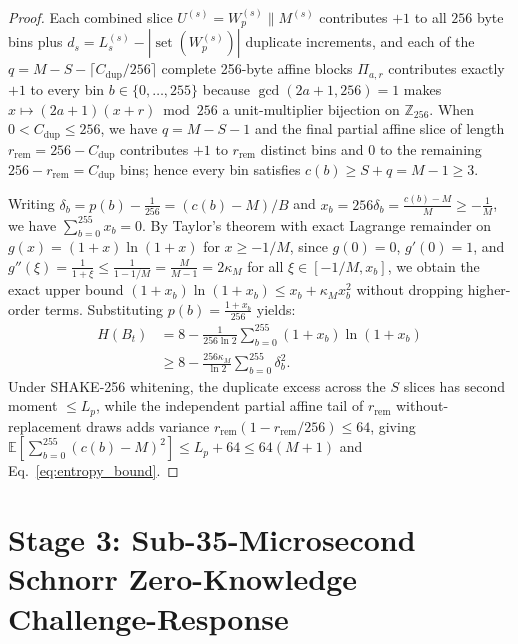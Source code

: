 \documentclass[conference,10pt]{IEEEtran}
\begin{document}
\begin{proof}
Each combined slice $U^{(s)} = W_p^{(s)} \parallel M^{(s)}$ contributes $+1$ to all $256$ byte bins plus $d_s = L_s^{(s)} - |\operatorname{set}(W_p^{(s)})|$ duplicate increments, and each of the $q = M - S - \lceil C_{\text{dup}} / 256 \rceil$ complete 256-byte affine blocks $\Pi_{a,r}$ contributes exactly $+1$ to every bin $b \in \{0,\dots,255\}$ because $\gcd(2a+1, 256) = 1$ makes $x \mapsto (2a+1)(x+r) \bmod 256$ a unit-multiplier bijection on $\mathbb{Z}_{256}$. When $0 < C_{\text{dup}} \le 256$, we have $q = M - S - 1$ and the final partial affine slice of length $r_{\text{rem}} = 256 - C_{\text{dup}}$ contributes $+1$ to $r_{\text{rem}}$ distinct bins and $0$ to the remaining $256 - r_{\text{rem}} = C_{\text{dup}}$ bins; hence every bin satisfies $c(b) \ge S + q = M - 1 \ge 3$.

Writing $\delta_b = p(b) - \frac{1}{256} = (c(b) - M)/B$ and $x_b = 256\delta_b = \frac{c(b)-M}{M} \ge -\frac{1}{M}$, we have $\sum_{b=0}^{255} x_b = 0$. By Taylor's theorem with exact Lagrange remainder on $g(x) = (1+x)\ln(1+x)$ for $x \ge -1/M$, since $g(0)=0$, $g'(0)=1$, and $g''(\xi) = \frac{1}{1+\xi} \le \frac{1}{1 - 1/M} = \frac{M}{M-1} = 2\kappa_M$ for all $\xi \in [-1/M, x_b]$, we obtain the exact upper bound $(1+x_b)\ln(1+x_b) \le x_b + \kappa_M x_b^2$ without dropping higher-order terms. Substituting $p(b) = \frac{1 + x_b}{256}$ yields:
\begin{equation}
\begin{aligned}
H(B_t) &= 8 - \frac{1}{256 \ln 2} \sum_{b=0}^{255} (1 + x_b)\ln(1 + x_b) \\
&\ge 8 - \frac{256 \kappa_M}{\ln 2} \sum_{b=0}^{255} \delta_b^2.
\end{aligned}
\end{equation}
Under SHAKE-256 whitening, the duplicate excess across the $S$ slices has second moment $\le L_p$, while the independent partial affine tail of $r_{\text{rem}}$ without-replacement draws adds variance $r_{\text{rem}}(1 - r_{\text{rem}}/256) \le 64$, giving $\mathbb{E}[\sum_{b=0}^{255} (c(b)-M)^2] \le L_p + 64 \le 64(M+1)$ and Eq.~\eqref{eq:entropy_bound}.
\end{proof}

\section{Stage 3: Sub-35-Microsecond Schnorr Zero-Knowledge Challenge-Response}
\label{sec:stage3}
\end{document}

